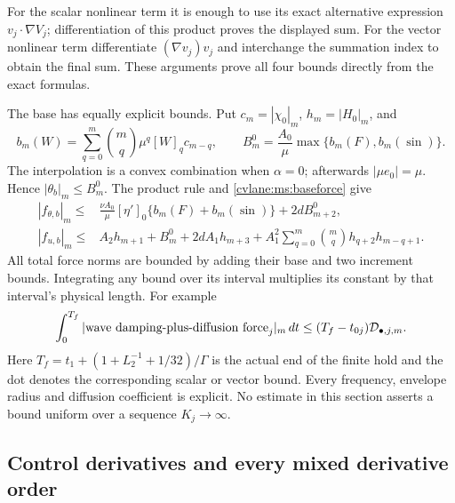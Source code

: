 For the scalar nonlinear term it is enough to use its exact
alternative expression $v_j\cdot\nabla V_j$; differentiation
of this product proves the displayed sum. For the vector nonlinear
term differentiate $(\nabla v_j)v_j$ and interchange the summation
index to obtain the final sum. These arguments prove all four
bounds directly from the exact formulas.

The base has equally explicit bounds. Put
$c_m=|\chi_0|_m$, $h_m=|H_0|_m$, and
\[
 b_m(W)=\sum_{q=0}^m\binom mq\mu^q[W]_q c_{m-q},
 \qquad B_m^0=\frac{A_0}{\mu}\max\{b_m(F),b_m(\sin)\}.
\]
The interpolation is a convex combination when $\alpha=0$;
afterwards $|\mu e_0|=\mu$. Hence $|\theta_b|_m\leq B_m^0$.
The product rule and \eqref{cvlane:ms:baseforce} give
\begin{align}
 |f_{\theta,b}|_m\leq{}&
       \frac{\nu A_0}{\mu}[\eta']_0\{b_m(F)+b_m(\sin)\}+2dB_{m+2}^0,
 \nonumber\\
 |f_{u,b}|_m\leq{}&A_2h_{m+1}+B_m^0+2dA_1h_{m+3}
       +A_1^2\sum_{q=0}^m\binom mq h_{q+2}h_{m-q+1}.
 \label{cvlane:ms:basenorm}
\end{align}
All total force norms are bounded by adding their base and two
increment bounds. Integrating any bound over its interval multiplies
its constant by that interval's physical length. For example
\begin{equation}\label{cvlane:ms:timecost}
 \int_0^{T_f}|\hbox{wave damping-plus-diffusion force}_j|_m\,dt
 \leq (T_f-t_{0j})\mathcal D_{\bullet,j,m}.
\end{equation}
Here $T_f=t_1+(1+L_2^{-1}+1/32)/\Gamma$ is the actual end
of the finite hold and the dot denotes the corresponding scalar or
vector bound. Every frequency, envelope radius and diffusion
coefficient is explicit. No estimate in this section asserts a bound
uniform over a sequence $K_j\to\infty$.

\subsection{Control derivatives and every mixed derivative order}

